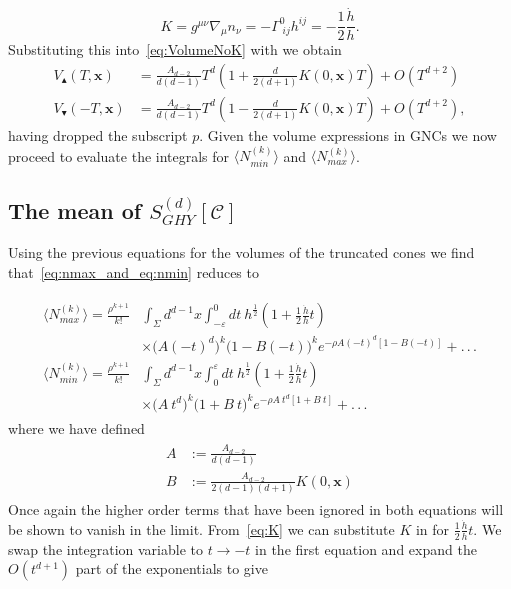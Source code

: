 \documentclass[12pt]{article}
\newcommand{\be}{\begin{equation}}
\newcommand{\ee}{\end{equation}}
\begin{document}
\be\label{eq:K}
K
=g^{\mu\nu }\nabla_{\mu}n_{\nu}
=-\Gamma^{0}_{\;ij}h^{ij}=-\frac{1}{2}\frac{\dot{h}}{h}.
\ee
Substituting this into~\eqref{eq:VolumeNoK} with we obtain 
\begin{align}
V_\blacktriangle(T,\mathbf x)
&=\frac{A_{d-2}}{d(d-1)}T^d\left(1+\frac{d}{2(d+1)}K(0,\mathbf{x})T\right)
+O(T^{d+2}) \label{eq:TopVolumeWithK}\\
V_\blacktriangledown(-T,\mathbf x)
&=\frac{A_{d-2}}{d(d-1)}T^d\left(1-\frac{d}{2(d+1)}K(0,\mathbf{x})T\right)
+O(T^{d+2}), \label{eq:BottomVolumeWithK}
\end{align}
having dropped the subscript $p$. Given the volume expressions in GNCs we now proceed to evaluate the integrals for $\langle N_{min}^{(k)}\rangle $ and $\langle N_{max}^{(k)}\rangle$.

\subsection{The mean of $S^{(d)}_{GHY}[\mathcal C]$}

Using the previous equations for the volumes of the truncated cones we find that~\eqref{eq:nmax_and_eq:nmin} reduces to

\begin{gather}\label{eq:nmax_and_eq:nmin_volume_expanded}
\begin{aligned}
\langle N_{max}^{(k)}\rangle = \frac{\rho^{k+1}}{k!} & \int_{\Sigma}d^{d-1}x\int_{-\varepsilon}^{0}dt\:
h^{\frac{1}{2}}\left(1+
\frac{1}{2}\frac{\dot{h}}{h}t\right)
 \\
 & \times \Big( A(-t)^d \Big)^k 
 \Big( 1 - B(-t) \Big)^k
 e^{-\rho A(-t)^d \left[1-B(-t) \right]} + .\,.\,.
\\
\langle N_{min}^{(k)}\rangle = \frac{\rho^{k+1}}{k!} & \int_{\Sigma}d^{d-1}x\int_{0}^{\varepsilon}dt\:
h^{\frac{1}{2}}\left(1+
\frac{1}{2}\frac{\dot{h}}{h}t\right)
 \\
 & \times \Big( A\: t^d \Big)^k 
 \Big( 1 + B\: t \Big)^k
 e^{-\rho A\: t^d \left[1+B\: t \right]} + .\,.\,.
\end{aligned}
\end{gather}
where we have defined
\begin{gather}\label{A_and_B_defn}
\begin{aligned}
A & := \frac{A_{d-2}}{d(d-1)} \\
B & := \frac{A_{d-2}}{2(d-1)(d+1)}K(0,\mathbf{x})
\end{aligned}
\end{gather}
Once again the higher order terms that have been ignored in both equations will be shown to vanish in the limit. From~\eqref{eq:K} we can substitute $K$ in for $\frac{1}{2}\frac{\dot{h}}{h}t$. We swap the integration variable to $t\rightarrow -t$ in the first equation and expand the $O(t^{d+1})$ part of the exponentials to give
\end{document}
